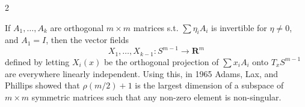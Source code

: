\documentclass[12pt]{article}
\numberwithin{equation}{section}
\def\R{\mathbf{R}}
\theoremstyle{plain}
\theoremstyle{remark}
\begin{document}
{{\begin{multicols}{2}
{\begin{figure}
\end{figure}

If $A_1,\dots,A_k$ are orthogonal $m \times m$ matrices s.t. $\sum \eta_i A_i$ is invertible for $\eta \neq 0$, and $A_1 = I$, then the vector fields
%
\[ X_1,\dots,X_{k-1}: S^{m-1} \to \R^m \]
%
defined by letting $X_i(x)$ be the orthogonal projection of $\sum x_i A_i$ onto $T_x S^{m-1}$ are everywhere linearly independent. Using this, in 1965 Adams, Lax, and Phillips showed that $\rho(m/2) + 1$ is the largest dimension of a subspace of $m \times m$ symmetric matrices such that any non-zero element is non-singular.
}


\end{multicols}}}\\


\end{document}
